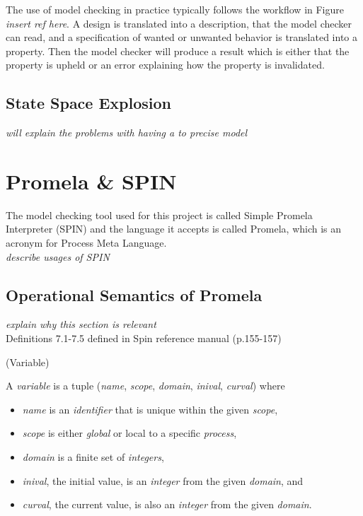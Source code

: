 
The use of model checking in practice typically follows the workflow in Figure \textit{insert ref here}. A design is translated into a description, that the model checker can read, and a specification of wanted or unwanted behavior is translated into a property. Then the model checker will produce a result which is either that the property is upheld or an error explaining how the property is invalidated. 

\subsection{State Space Explosion}

\textit{will explain the problems with having a to precise model}

\section{Promela \& SPIN}

The model checking tool used for this project is called Simple Promela Interpreter (SPIN) and the language it accepts is called Promela, which is an acronym for Process Meta Language. \\

\textit{describe usages of SPIN}

\subsection{Operational Semantics of Promela}

\textit{explain why this section is relevant} \\

Definitions 7.1-7.5 defined in Spin reference manual (p.155-157) \cite{spinreferencemanualbook}

\begin{definition}{}{}
\label{def:Variable}
(Variable) 

A \textit{variable} is a tuple (\textit{name}, \textit{scope}, \textit{domain}, \textit{inival}, \textit{curval}) where

\begin{itemize}
\item[] \textit{name} is an \textit{identifier} that is unique within the given \textit{scope},
\item[] \textit{scope} is either \textit{global} or local to a specific \textit{process},
\item[] \textit{domain} is a finite set of \textit{integers},
\item[] \textit{inival}, the initial value, is an \textit{integer} from the given \textit{domain}, and
\item[] \textit{curval}, the current value, is also an \textit{integer} from the given \textit{domain}.
\end{itemize}
\end{definition}

